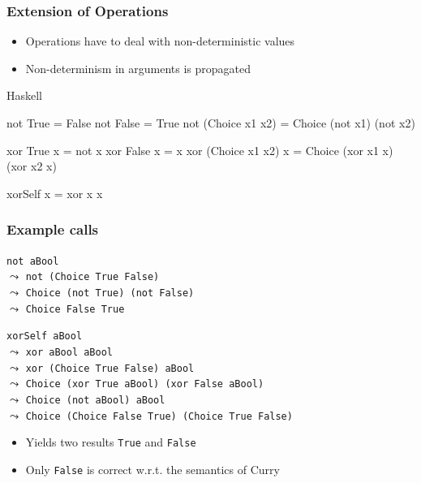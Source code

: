 \documentclass[utf8]{beamer}
\newenvironment{program}{\begin{semiverbatim}\small}{\end{semiverbatim}}
\begin{document}
\begin{frame}[fragile]
\frametitle{Extension of Operations}
\begin{itemize}
  \item Operations have to deal with non-deterministic values
  \item Non-determinism in arguments is propagated
\end{itemize}
\pause
\begin{block}{Haskell}
\begin{program}
not True           = False
not False          = True
not (Choice x1 x2) = Choice (not x1) (not x2)

xor True           x = not x
xor False          x = x
xor (Choice x1 x2) x = Choice (xor x1 x) (xor x2 x)

xorSelf x = xor x x
\end{program}
\end{block}
\end{frame}


\begin{frame}[fragile]
\frametitle{Example calls}
\begin{example}
\verb!not aBool!\\
$\leadsto$ \verb!not (Choice True False)!\\
$\leadsto$ \verb!Choice (not True) (not False)!\\
$\leadsto$ \verb!Choice False True!
\end{example}
\pause
\begin{example}
\verb!xorSelf aBool!\\
$\leadsto$ \verb!xor aBool aBool!\\
$\leadsto$ \verb!xor (Choice True False) aBool!\\
$\leadsto$ \verb!Choice (xor True aBool) (xor False aBool)!\\
$\leadsto$ \verb!Choice (not aBool) aBool!\\
$\leadsto$ \verb!Choice (Choice False True) (Choice True False)!
\end{example}
\begin{itemize}
  \item Yields two results \verb!True! and \verb!False!
  \item Only \verb!False! is correct w.r.t. the semantics of Curry
\end{itemize}
\end{frame}
\end{document}
